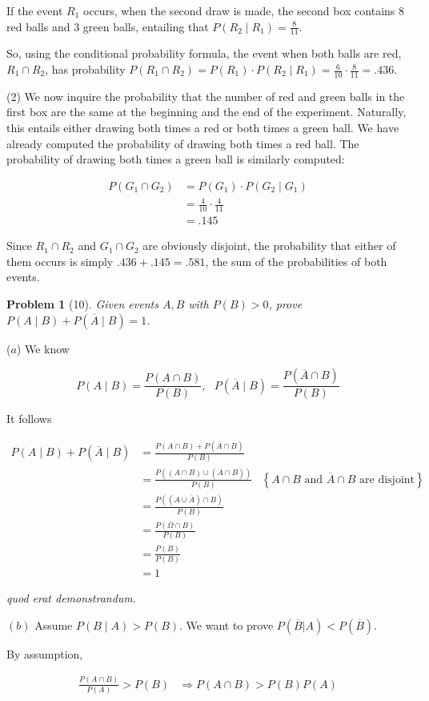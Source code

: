 \documentclass[a4paper, 12pt]{article}
\newtheorem{problem}{Problem}
\newtheorem{problem}{Problem}
\begin{document}
   If the event $R_1$ occurs, when the second draw is made, the second box 
   contains $8$ red balls and $3$ green balls, entailing that 
   $P(R_2 \mid  R_1) = \frac{8}{11} $.

   So, using the conditional probability formula, the event when both balls are
   red, $R_1 \cap R_2$, has probability $P(R_1 \cap R_2) = P(R_1) \cdot P(R_2
   \mid R_1) = \frac{6}{10} \cdot \frac{8}{11} = .436$.

   (2) We now inquire the probability that the number of red and green balls in the 
   first box are the same at the beginning and the end of the experiment. Naturally, 
   this entails either drawing both times a red or both times a green ball. We have 
   already computed the probability of drawing both times a red ball. The probability 
   of drawing both times a green ball is similarly computed: 

   \begin{align*}
       P(G_1 \cap G_2) &= P(G_1) \cdot P(G_2 \mid G_1) \\ 
       &= \frac{4}{10} \cdot \frac{4}{11} \\ 
       &= .145
   \end{align*}


   Since $R_1 \cap R_2$ and $G_1 \cap G_2$ are obviously disjoint, the probability that 
   either of them occurs is simply $.436 + .145 = .581$, the sum of the probabilities 
   of both events.

   \pagebreak 


   \begin{problem}[10]
       Given events $A, B$ with $P(B) > 0$, prove $P(A \mid B) + P(\overline{A} \mid B) = 1$.
   \end{problem}

   ($a$) We know 

   \begin{equation*}
       P(A \mid B) = \frac{P(A \cap B)}{P(B)}, ~ ~ ~ P(\overline{A} \mid B) = \frac{P(\overline{A} \cap B)}{P(B)}
   \end{equation*}

   It follows 

   \begin{align*}
       P(A \mid B) + P(\overline{A} \mid B) &= \frac{P(A \cap B) + P(\overline{A} \cap B)}{P(B)}  \\ 
                                            &= \frac{P\left((A \cap B) \cup (\overline{A} \cap B)\right)}{P(B)} &\left\{ A \cap B \text{  and } \overline{A} \cap B \text{ are disjoint}\right\} \\ 
                                            &= \frac{ P\left( ( A \cup \overline{A} ) \cap B \right)    }{P(B)} \\ 
                                            &= \frac{ P(\Omega \cap B) }{P(B)} \\ 
                                            &= \frac{P(B)}{P(B)} \\ 
                                            &= 1
   \end{align*}

   \textit{quod erat demonstrandum}.

   $(b)$ Assume $P(B \mid A) > P(B)$. We want to prove $P(\overline{B} | A) <
   P(\overline{B})$. 

   By assumption,

   \begin{align*}
       \frac{P(A \cap B)}{P(A)} > P(B) &\Rightarrow P(A \cap B) > P(B)P(A)
   \end{align*}
\end{document}
